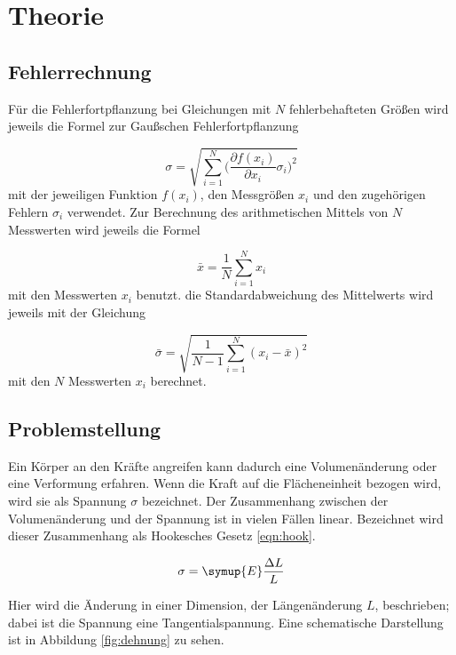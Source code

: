 \section{Theorie}
\label{sec:Theorie}

\subsection{Fehlerrechnung}

Für die Fehlerfortpflanzung bei Gleichungen mit $N$ fehlerbehafteten Größen
wird jeweils die Formel zur Gaußschen Fehlerfortpflanzung

\begin{equation}
  \sigma = \sqrt{\sum_{i=1}^{N}\biggl(\frac{\partial f(x_i)}{\partial x_i}
  \sigma_i\biggr)^2}
\end{equation}
mit der jeweiligen Funktion $f(x_i)$, den Messgrößen $x_i$ und den
zugehörigen Fehlern $\sigma_i$ verwendet.
Zur Berechnung des arithmetischen Mittels von $N$ Messwerten wird jeweils die
Formel

\begin{equation}
  \bar{x} = \frac{1}{N}\sum_{i=1}^{N}x_i
\end{equation}
mit den Messwerten $x_i$ benutzt.
die Standardabweichung des Mittelwerts wird jeweils mit der Gleichung

\begin{equation}
  \bar{\sigma} = \sqrt{\frac{1}{N-1}\sum_{i=1}^{N}(x_i - \bar{x})^2}
\end{equation}
mit den $N$ Messwerten $x_i$ berechnet.

\subsection{Problemstellung}

Ein Körper an den Kräfte angreifen kann dadurch eine Volumenänderung oder eine
Verformung erfahren. Wenn die Kraft auf die Flächeneinheit bezogen wird, wird sie
als Spannung $\sigma$ bezeichnet. Der Zusammenhang zwischen der Volumenänderung
und der Spannung ist in vielen Fällen linear. Bezeichnet wird dieser Zusammenhang
als Hookesches Gesetz \eqref{eqn:hook}.

\begin{equation}
  \sigma = \symup{E} \frac{\Delta L}{L}
  \label{eqn:hook}
\end{equation}

Hier wird die Änderung in einer Dimension, der Längenänderung $L$, beschrieben;
dabei ist die Spannung eine Tangentialspannung. Eine schematische Darstellung ist
in Abbildung \ref{fig:dehnung} zu sehen.


